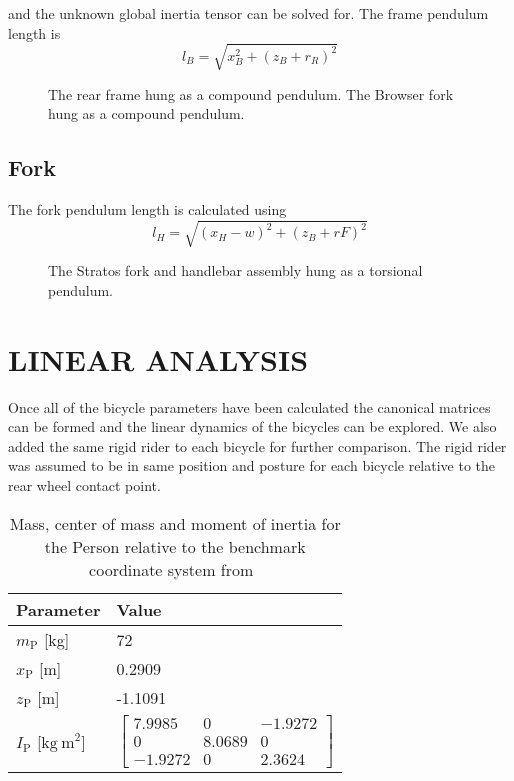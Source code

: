 \documentclass{bmd2010p}
\begin{document}
and the unknown global inertia tensor can be solved for.
The frame pendulum length is
\begin{equation}
    l_B=\sqrt{x_B^2+(z_B+r_R)^2}
\end{equation}
\begin{figure}[tbp]
    \centering
        \caption{ The rear frame hung as a compound
        pendulum.  The Browser fork hung as a
        compound pendulum.}
        \label{fig:compound}
\end{figure}
\subsection{Fork}
The fork pendulum length is calculated using
\begin{equation}
    l_H=\sqrt{(x_H-w)^2+(z_B+rF)^2}
\end{equation}
\begin{figure}[tbp]
    \centering
    \caption{ The Stratos fork and handlebar assembly hung as a torsional
        pendulum.}
    \label{fig:torsional}
\end{figure}
\section{LINEAR ANALYSIS}
Once all of the bicycle parameters have been calculated the canonical matrices
can be formed and the linear dynamics of the bicycles can be explored. We also
added the same rigid rider to each bicycle for further comparison. The rigid
rider was assumed to be in same position and posture for each bicycle relative
to the rear wheel contact point.
\begin{table}[tbp]
    \centering
    \begin{tabular}{ll}
        Parameter & Value\\
        \hline
        $m_\mathrm{P}$ [kg] & 72\\
        $x_\mathrm{P}$ [m] & 0.2909\\
        $z_\mathrm{P}$ [m] & -1.1091\\
        $I_\mathrm{P}$ [$\mathrm{kg\ m}^2$] &
            $\left[
            \begin{array}{ccc}
                 7.9985 & 0      & -1.9272\\
                 0      & 8.0689 & 0\\
                -1.9272 & 0      & 2.3624
            \end{array}
            \right]$
    \end{tabular}
    \caption{Mass, center of mass and moment of inertia for the Person relative
    to the benchmark coordinate system from~\cite{Moore2009a}}
    \label{tab:riderParam}
\end{table}
\end{document}
